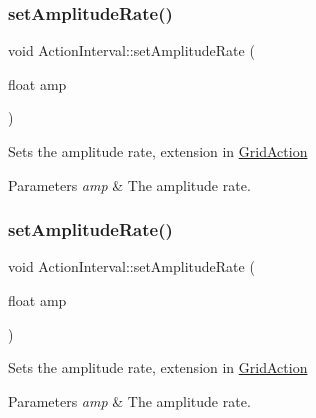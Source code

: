 \mbox{\label{classActionInterval_a08c4d7dd0e8e3fb5e6b6684c6e1d86df}} 
\subsubsection{\texorpdfstring{set\+Amplitude\+Rate()}{setAmplitudeRate()}\hspace{0.1cm}{\footnotesize\ttfamily [1/2]}}
{\footnotesize\ttfamily void Action\+Interval\+::set\+Amplitude\+Rate (\begin{DoxyParamCaption}\item[{float}]{amp }\end{DoxyParamCaption})}

Sets the amplitude rate, extension in \hyperlink{classGridAction}{Grid\+Action}


\begin{DoxyParams}{Parameters}
{\em amp} & The amplitude rate. \\
\hline
\end{DoxyParams}
\mbox{\label{classActionInterval_a08c4d7dd0e8e3fb5e6b6684c6e1d86df}} 
\subsubsection{\texorpdfstring{set\+Amplitude\+Rate()}{setAmplitudeRate()}\hspace{0.1cm}{\footnotesize\ttfamily [2/2]}}
{\footnotesize\ttfamily void Action\+Interval\+::set\+Amplitude\+Rate (\begin{DoxyParamCaption}\item[{float}]{amp }\end{DoxyParamCaption})}

Sets the amplitude rate, extension in \hyperlink{classGridAction}{Grid\+Action}


\begin{DoxyParams}{Parameters}
{\em amp} & The amplitude rate. \\
\hline
\end{DoxyParams}
\mbox{\label{classActionInterval_ad3d91186b2c3108488ddbbdbbd982484}} 
